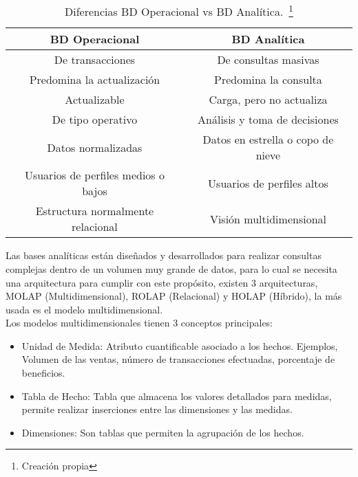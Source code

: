 \begin{table}[H]
\begin{minipage}{\textwidth} 
\centering
\begin{tabular}{ | c | c |}
\hline
BD Operacional & BD Analítica\\ \hline
De transacciones & De consultas masivas \\ \hline
Predomina la actualización & Predomina la consulta \\ \hline
Actualizable & Carga, pero no actualiza \\ \hline
De tipo operativo & Análisis y toma de decisiones \\ \hline
Datos normalizadas & Datos en estrella o copo de nieve \\ \hline
Usuarios de perfiles medios o bajos & Usuarios de perfiles altos \\ \hline
Estructura normalmente relacional & Visión multidimensional\\ \hline
\end{tabular}\newline
\caption[Diferencias BD Operacional vs BD Analítica.]{Diferencias BD Operacional vs BD Analítica.~\footnote{Creación propia}}
\label{tabla:bdovsbda}
\end{minipage}
\end{table}

Las bases analíticas están diseñados y desarrollados para realizar consultas complejas dentro de un volumen muy grande de datos, para lo cual se necesita una arquitectura para cumplir con este propósito, existen 3 arquitecturas, MOLAP (Multidimensional), ROLAP (Relacional) y HOLAP (Híbrido), la más usada es el modelo multidimensional.\\

Los modelos multidimensionales tienen 3 conceptos principales:

\begin{itemize}
    \item Unidad de Medida:
    Atributo cuantificable asociado a los hechos. Ejemplos, Volumen de las ventas, número de transacciones efectuadas, porcentaje de beneficios.
    
    \item Tabla de Hecho:
    Tabla que almacena los valores detallados para medidas, permite realizar inserciones entre las dimensiones y las medidas.
    
    \item Dimensiones:
    Son tablas que permiten la agrupación de los hechos.

\end{itemize}

